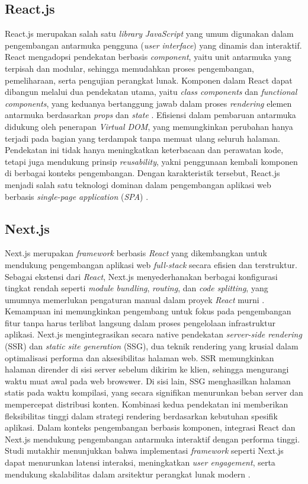 \newpage


\subsection{React.js}

React.js merupakan salah satu \emph{library} \emph{JavaScript} yang umum digunakan dalam pengembangan antarmuka pengguna (\emph{user interface}) yang dinamis dan interaktif. React mengadopsi pendekatan berbasis \emph{component}, yaitu unit antarmuka yang terpisah dan modular, sehingga memudahkan proses pengembangan, pemeliharaan, serta pengujian perangkat lunak. Komponen dalam React dapat dibangun melalui dua pendekatan utama, yaitu \emph{class components} dan \emph{functional components}, yang keduanya bertanggung jawab dalam proses \emph{rendering} elemen antarmuka berdasarkan \emph{props} dan \emph{state} \cite{Panjaitan2021}. Efisiensi dalam pembaruan antarmuka didukung oleh penerapan \emph{Virtual DOM}, yang memungkinkan perubahan hanya terjadi pada bagian yang terdampak tanpa memuat ulang seluruh halaman. Pendekatan ini tidak hanya meningkatkan keterbacaan dan perawatan kode, tetapi juga mendukung prinsip \emph{reusability}, yakni penggunaan kembali komponen di berbagai konteks pengembangan. Dengan karakteristik tersebut, React.js menjadi salah satu teknologi dominan dalam pengembangan aplikasi web berbasis \emph{single-page application} (\emph{SPA}) \cite{Panjaitan2021}.

\subsection{Next.js}
Next.js merupakan \emph{framework} berbasis \emph{React} yang dikembangkan untuk mendukung pengembangan aplikasi web \emph{full-stack} secara efisien dan terstruktur. Sebagai ekstensi dari \emph{React}, Next.js menyederhanakan berbagai konfigurasi tingkat rendah seperti \emph{module bundling}, \emph{routing}, dan \emph{code splitting}, yang umumnya memerlukan pengaturan manual dalam proyek \emph{React} murni \cite{Nextjs2024}. Kemampuan ini memungkinkan pengembang untuk fokus pada pengembangan fitur tanpa harus terlibat langsung dalam proses pengelolaan infrastruktur aplikasi. Next.js mengintegrasikan secara native pendekatan \emph{server-side rendering} (SSR) dan \emph{static site generation} (SSG), dua teknik rendering yang krusial dalam optimalisasi performa dan aksesibilitas halaman web. SSR memungkinkan halaman dirender di sisi server sebelum dikirim ke klien, sehingga mengurangi waktu muat awal pada web browswer. Di sisi lain, SSG menghasilkan halaman statis pada waktu kompilasi, yang secara signifikan menurunkan beban server dan mempercepat distribusi konten. Kombinasi kedua pendekatan ini memberikan fleksibilitas tinggi dalam strategi rendering berdasarkan kebutuhan spesifik aplikasi. Dalam konteks pengembangan berbasis komponen, integrasi React dan Next.js mendukung pengembangan antarmuka interaktif dengan performa tinggi. Studi mutakhir menunjukkan bahwa implementasi \emph{framework} seperti Next.js dapat menurunkan latensi interaksi, meningkatkan \emph{user engagement}, serta mendukung skalabilitas dalam arsitektur perangkat lunak modern \cite{Nextjs2024}.

